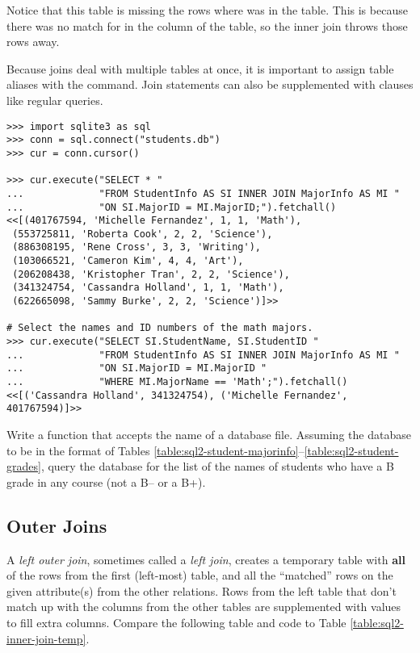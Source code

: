 Notice that this table is missing the rows where  was  in the  table.
This is because there was no match for  in the  column of the  table, so the inner join throws those rows away.

Because joins deal with multiple tables at once, it is important to assign table aliases with the  command.
Join statements can also be supplemented with  clauses like regular queries.

\begin{lstlisting}
>>> import sqlite3 as sql
>>> conn = sql.connect("students.db")
>>> cur = conn.cursor()

>>> cur.execute("SELECT * "
...             "FROM StudentInfo AS SI INNER JOIN MajorInfo AS MI "
...             "ON SI.MajorID = MI.MajorID;").fetchall()
<<[(401767594, 'Michelle Fernandez', 1, 1, 'Math'),
 (553725811, 'Roberta Cook', 2, 2, 'Science'),
 (886308195, 'Rene Cross', 3, 3, 'Writing'),
 (103066521, 'Cameron Kim', 4, 4, 'Art'),
 (206208438, 'Kristopher Tran', 2, 2, 'Science'),
 (341324754, 'Cassandra Holland', 1, 1, 'Math'),
 (622665098, 'Sammy Burke', 2, 2, 'Science')]>>

# Select the names and ID numbers of the math majors.
>>> cur.execute("SELECT SI.StudentName, SI.StudentID "
...             "FROM StudentInfo AS SI INNER JOIN MajorInfo AS MI "
...             "ON SI.MajorID = MI.MajorID "
...             "WHERE MI.MajorName == 'Math';").fetchall()
<<[('Cassandra Holland', 341324754), ('Michelle Fernandez', 401767594)]>>
\end{lstlisting}

\begin{problem} %
Write a function that accepts the name of a database file.
Assuming the database to be in the format of Tables \ref{table:sql2-student-majorinfo}--\ref{table:sql2-student-grades}, query the database for the list of the names of students who have a B grade in any course (not a B-- or a B+).
\end{problem}

\subsection*{Outer Joins} %

A \emph{left outer join}, sometimes called a \emph{left join}, creates a temporary table with \textbf{all} of the rows from the first (left-most) table, and all the ``matched'' rows on the given attribute(s) from the other relations.
Rows from the left table that don't match up with the columns from the other tables are supplemented with  values to fill extra columns.
Compare the following table and code to Table \ref{table:sql2-inner-join-temp}.

